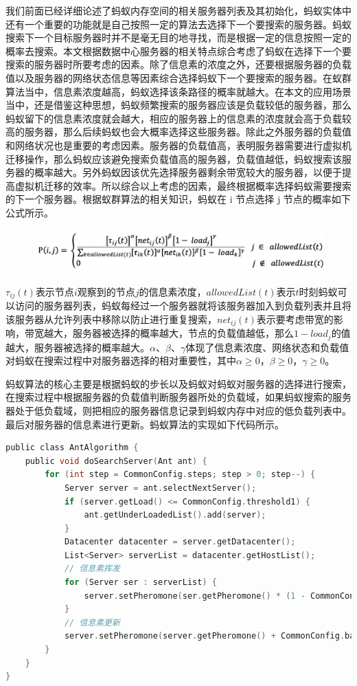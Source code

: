 我们前面已经详细论述了蚂蚁内存空间的相关服务器列表及其初始化，蚂蚁实体中还有一个重要的功能就是自己按照一定的算法去选择下一个要搜索的服务器。蚂蚁搜索下一个目标服务器时并不是毫无目的地寻找，而是根据一定的信息按照一定的概率去搜索。本文根据数据中心服务器的相关特点综合考虑了蚂蚁在选择下一个要搜索的服务器时所要考虑的因素。除了信息素的浓度之外，还要根据服务器的负载值以及服务器的网络状态信息等因素综合选择蚂蚁下一个要搜索的服务器。在蚁群算法当中，信息素浓度越高，蚂蚁选择该条路径的概率就越大。在本文的应用场景当中，还是借鉴这种思想，蚂蚁频繁搜索的服务器应该是负载较低的服务器，那么蚂蚁留下的信息素浓度就会越大，相应的服务器上的信息素的浓度就会高于负载较高的服务器，那么后续蚂蚁也会大概率选择这些服务器。除此之外服务器的负载值和网络状况也是重要的考虑因素。服务器的负载值高，表明服务器需要进行虚拟机迁移操作，那么蚂蚁应该避免搜索负载值高的服务器，负载值越低，蚂蚁搜索该服务器的概率越大。另外蚂蚁因该优先选择服务器剩余带宽较大的服务器，以便于提高虚拟机迁移的效率。所以综合以上考虑的因素，最终根据概率选择蚂蚁需要搜索的下一个服务器。根据蚁群算法的相关知识，蚂蚁在 i 节点选择 j 节点的概率如下公式所示。

\begin{figure}[htb]
  \centering
  \includegraphics[width=0.8\linewidth]{./Figure/IMG_Chap3_5.png}
\end{figure}

$ τ_{ij} (t) $表示节点$ i $观察到的节点$ j $的信息素浓度，$allowedList(t) $表示$ t $时刻蚂蚁可以访问的服务器列表，蚂蚁每经过一个服务器就将该服务器加入到负载列表并且将该服务器从允许列表中移除以防止进行重复搜索，$net_{ij} (t) $表示要考虑带宽的影响，带宽越大，服务器被选择的概率越大，节点的负载值越低，那么$ 1 - load_j $的值越大，服务器被选择的概率越大。$ α、β、γ $体现了信息素浓度、网络状态和负载值对蚂蚁在搜索过程中对服务器选择的相对重要性，其中$ α ≥0，β ≥0，γ ≥0 $。

蚂蚁算法的核心主要是根据蚂蚁的步长以及蚂蚁对蚂蚁对服务器的选择进行搜索，在搜索过程中根据服务器的负载值判断服务器所处的负载域，如果蚂蚁搜索的服务器处于低负载域，则把相应的服务器信息记录到蚂蚁内存中对应的低负载列表中。最后对服务器的信息素进行更新。蚂蚁算法的实现如下代码所示。

\begin{lstlisting}[language=C,caption={蚂蚁算法},label=Code:java]
public class AntAlgorithm {
    public void doSearchServer(Ant ant) {
        for (int step = CommonConfig.steps; step > 0; step--) {
            Server server = ant.selectNextServer();
            if (server.getLoad() <= CommonConfig.threshold1) {
                ant.getUnderLoadedList().add(server);
            }
            Datacenter datacenter = server.getDatacenter();
            List<Server> serverList = datacenter.getHostList();
            // 信息素挥发
            for (Server ser : serverList) {
                server.setPheromone(ser.getPheromone() * (1 - CommonConfig.rate));
            }
            // 信息素更新
            server.setPheromone(server.getPheromone() + CommonConfig.base * (1 - server.getLoad()));
        }
    }
}
\end{lstlisting}

